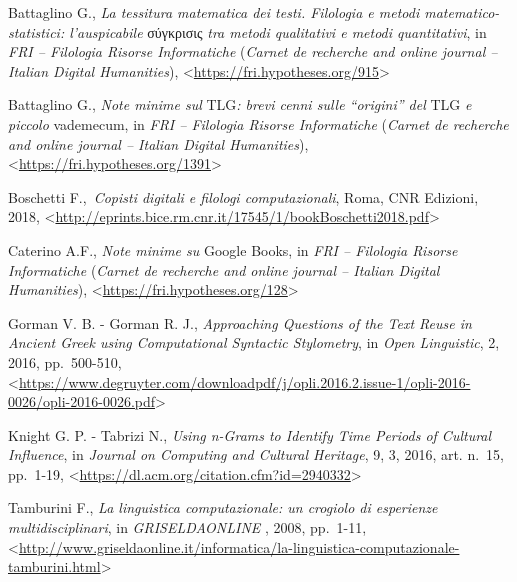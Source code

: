 \documentclass[
  b5paper,
  twoside,
  11pt,
  chapterprefix=false,
  bibliography=totocnumbered,
  listof=flat]{scrbook}
\begin{document}
Battaglino G., \emph{La tessitura matematica dei testi. Filologia e metodi
matematico-statistici: l'auspicabile} σύγκρισις \emph{tra metodi qualitativi
e metodi quantitativi}, in \emph{FRI -- Filologia Risorse Informatiche}
(\emph{Carnet de recherche and online journal -- Italian Digital
Humanities}),
\textless{}\href{https://fri.hypotheses.org/915}{{https://fri.hypotheses.org/915}}\textgreater{}

Battaglino G., \emph{Note minime sul} TLG\emph{: brevi cenni sulle \enquote{origini} del}
TLG \emph{e piccolo} vademecum, in \emph{FRI -- Filologia Risorse Informatiche}
(\emph{Carnet de recherche and online journal -- Italian Digital
Humanities}),
\textless{}\href{https://fri.hypotheses.org/1391}{{https://fri.hypotheses.org/1391}}\textgreater{}

Boschetti F.,~\emph{Copisti digitali e filologi computazionali}, Roma, CNR
Edizioni, 2018,
\textless{}\href{http://eprints.bice.rm.cnr.it/17545/1/bookBoschetti2018.pdf}{{http://eprints.bice.rm.cnr.it/17545/1/bookBoschetti2018.pdf}}\textgreater{}

Caterino A.F., \emph{Note minime su} Google Books, in \emph{FRI -- Filologia
Risorse Informatiche} (\emph{Carnet de recherche and online journal --
Italian Digital Humanities}),
\textless{}\href{https://fri.hypotheses.org/128}{{https://fri.hypotheses.org/128}}\textgreater{}

Gorman V. B. - Gorman R. J., \emph{Approaching Questions of the Text Reuse in
Ancient Greek using Computational Syntactic Stylometry}, in \emph{Open
Linguistic}, 2, 2016, pp.~500-510,
\textless{}\href{https://www.degruyter.com/downloadpdf/j/opli.2016.2.issue-1/opli-2016-0026/opli-2016-0026.pdf}{{https://www.degruyter.com/downloadpdf/j/opli.2016.2.issue-1/opli-2016-0026/opli-2016-0026.pdf}}\textgreater{}

Knight G. P. - Tabrizi N., \emph{Using n-Grams to Identify Time Periods of
Cultural Influence}, in \emph{Journal on Computing and Cultural Heritage}, 9,
3, 2016, art. n.~15, pp.~1-19,
\textless{}\href{https://dl.acm.org/citation.cfm?id=2940332}{{https://dl.acm.org/citation.cfm?id=2940332}}\textgreater{}

Tamburini F., \emph{La linguistica computazionale: un crogiolo di esperienze
multidisciplinari}, in \emph{GRISELDAONLINE} , 2008, pp.~1-11,
\textless{}\href{http://www.griseldaonline.it/informatica/la-linguistica-computazionale-tamburini.html}{{http://www.griseldaonline.it/informatica/la-linguistica-computazionale-tamburini.html}}\textgreater{}
\end{document}
